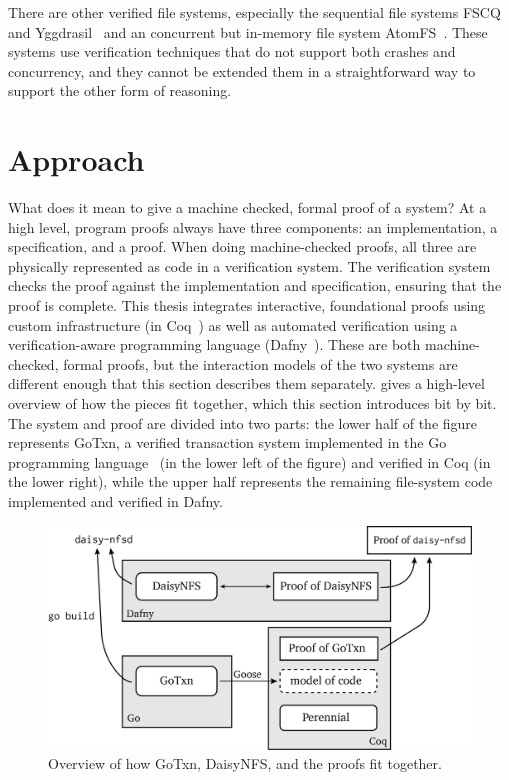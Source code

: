 There are other verified file systems, especially the sequential file systems
FSCQ~\cite{chen:fscq} and Yggdrasil~\cite{sigurbjarnarson:yggdrasil} and an
concurrent but in-memory file system AtomFS~\cite{zou:atomfs}. These systems use
verification techniques that do not support both crashes and concurrency, and they
cannot be extended them in a straightforward way to support the other form of reasoning.

\section{Approach}
\label{sec:intro:approach}

What does it mean to give a machine checked, formal proof of a system? At a high
level, program proofs always have three components: an implementation, a
specification, and a proof. When doing machine-checked proofs, all three are
physically represented as code in a verification system. The verification system
checks the proof against the implementation and specification, ensuring that the
proof is complete.
This thesis integrates interactive, foundational proofs using custom
infrastructure (in Coq~\cite{coq}) as well as automated verification using a
verification-aware programming language (Dafny~\cite{leino:dafny}). These are
both machine-checked, formal proofs, but the interaction models of the two
systems are different enough that this section describes them separately.
 gives a high-level overview of how the pieces fit together,
which this section introduces bit by bit. The system and proof are divided into
two parts: the lower half of the figure represents GoTxn, a verified transaction
system implemented in the Go programming language~\cite{lang:go} (in the lower
left of the figure) and verified in Coq (in the lower right), while the upper
half represents the remaining file-system code implemented and verified in
Dafny.

\begin{figure}[ht]
\includegraphics{fig/overview.png}
\caption{Overview of how GoTxn, DaisyNFS, and the proofs fit together.}
\label{fig:overview}
\end{figure}

